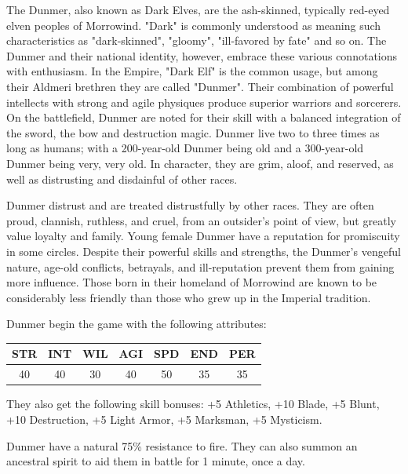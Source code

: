 \documentclass[12pt]{book}
\begin{document}
The Dunmer, also known as Dark Elves, are the ash-skinned, typically red-eyed elven peoples of Morrowind. "Dark" is commonly understood as meaning such characteristics as "dark-skinned", "gloomy", "ill-favored by fate" and so on. The Dunmer and their national identity, however, embrace these various connotations with enthusiasm. In the Empire, "Dark Elf" is the common usage, but among their Aldmeri brethren they are called "Dunmer". Their combination of powerful intellects with strong and agile physiques produce superior warriors and sorcerers. On the battlefield, Dunmer are noted for their skill with a balanced integration of the sword, the bow and destruction magic. Dunmer live two to three times as long as humans; with a 200-year-old Dunmer being old and a 300-year-old Dunmer being very, very old. In character, they are grim, aloof, and reserved, as well as distrusting and disdainful of other races.

Dunmer distrust and are treated distrustfully by other races. They are often proud, clannish, ruthless, and cruel, from an outsider's point of view, but greatly value loyalty and family. Young female Dunmer have a reputation for promiscuity in some circles. Despite their powerful skills and strengths, the Dunmer's vengeful nature, age-old conflicts, betrayals, and ill-reputation prevent them from gaining more influence. Those born in their homeland of Morrowind are known to be considerably less friendly than those who grew up in the Imperial tradition.

Dunmer begin the game with the following attributes:
\begin{center}
\begin{tabular}{|c|c|c|c|c|c|c|}
\hline
STR & INT & WIL & AGI & SPD & END & PER\\ \hline
40 & 40 & 30 & 40 & 50 & 35 & 35\\ \hline
\end{tabular}
\end{center}

They also get the following skill bonuses: +5 Athletics, +10 Blade, +5 Blunt, +10 Destruction, +5 Light Armor, +5 Marksman, +5 Mysticism.

Dunmer have a natural 75\% resistance to fire. They can also summon an ancestral spirit to aid them in battle for 1 minute, once a day.\\
\end{document}
